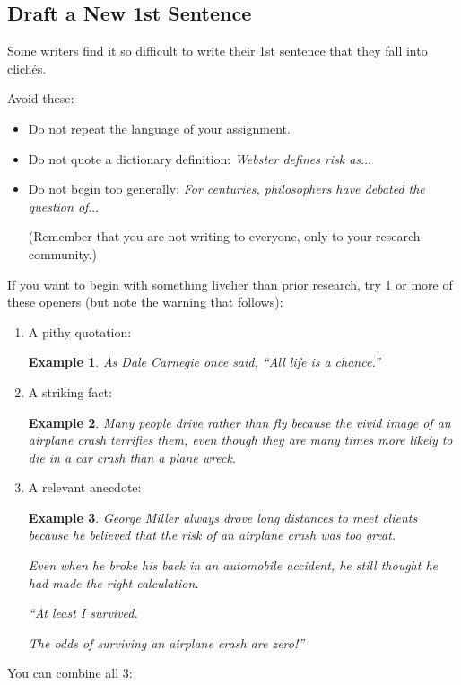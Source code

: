 \documentclass[oneside]{book}
\numberwithin{equation}{section}
\newtheorem{example}{Example}[section]
\begin{document}
\subsection{Draft a New 1st Sentence}
Some writers find it so difficult to write their 1st sentence that they fall into clich\'es.

Avoid these:
\begin{itemize}
    \item Do not repeat the language of your assignment.
    \item Do not quote a dictionary definition: \textit{Webster defines risk as$\ldots$}
    \item Do not begin too generally: \textit{For centuries, philosophers have debated the question of$\ldots$}
    
    (Remember that you are not writing to everyone, only to your research community.)
\end{itemize}
If you want to begin with something livelier than prior research, try 1 or more of these openers (but note the warning that follows):
\begin{enumerate}
    \item A pithy quotation:
    \begin{example}
        As Dale Carnegie once said, ``All life is a chance.''
    \end{example}
    \item A striking fact:
    \begin{example}
        Many people drive rather than fly because the vivid image of an airplane crash terrifies them, even though they are many times more likely to die in a car crash than a plane wreck.
    \end{example}
    \item A relevant anecdote:
    \begin{example}
        George Miller always drove long distances to meet clients because he believed that the risk of an airplane crash was too great.
        
        Even when he broke his back in an automobile accident, he still thought he had made the right calculation.
        
        ``At least I survived.
        
        The odds of surviving an airplane crash are zero!''
    \end{example}
\end{enumerate}
You can combine all 3:
\end{document}
